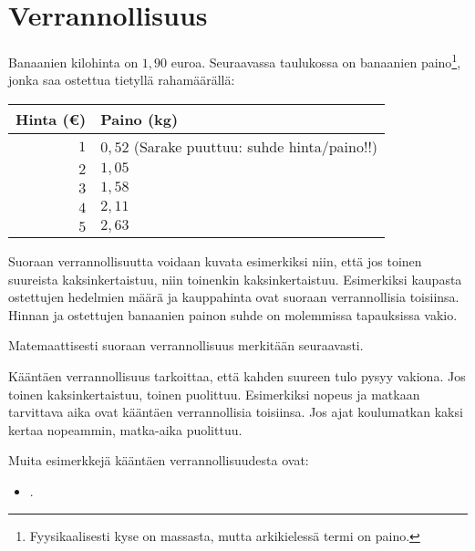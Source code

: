 \chapter{Verrannollisuus}


\begin{esimerkki}
Banaanien kilohinta on $1,90$ euroa. Seuraavassa taulukossa on
banaanien paino\footnote{Fyysikaalisesti kyse on massasta, mutta arkikielessä termi on paino.}, jonka saa ostettua tietyllä rahamäärällä:
\begin{center} 
\begin{tabular}{|r|l|}
\hline
Hinta (\euro) & Paino (kg) \\
\hline
$1$ & $0,52$ (Sarake puuttuu: suhde hinta/paino!!)  \\
$2$ & $1,05$ \\
$3$ & $1,58$ \\
$4$ & $2,11$ \\
$5$ & $2,63$ \\
\hline
\end{tabular}
\end{center}
\end{esimerkki}

Suoraan verrannollisuutta voidaan kuvata esimerkiksi niin, että jos
toinen suureista kaksinkertaistuu, niin toinenkin kaksinkertaistuu. Esimerkiksi kaupasta ostettujen hedelmien määrä ja kauppahinta ovat suoraan verrannollisia toisiinsa. Hinnan ja ostettujen banaanien painon suhde on molemmissa tapauksissa vakio.

Matemaattisesti suoraan verrannollisuus merkitään seuraavasti.



Kääntäen verrannollisuus tarkoittaa, että kahden suureen tulo pysyy vakiona. Jos toinen kaksinkertaistuu, toinen puolittuu. Esimerkiksi nopeus ja matkaan tarvittava aika ovat kääntäen verrannollisia toisiinsa. Jos ajat koulumatkan kaksi kertaa nopeammin, matka-aika puolittuu.

Muita esimerkkejä kääntäen verrannollisuudesta ovat:
\begin{itemize}
    \item .
\end{itemize}

